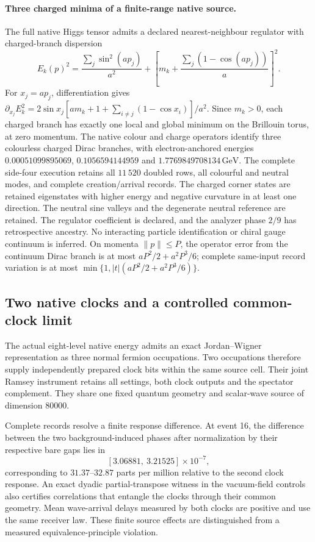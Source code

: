 \paragraph{Three charged minima of a finite-range native source.}
The full native Higgs tensor admits a declared nearest-neighbour regulator
with charged-branch dispersion
\[
 E_k(p)^2=\frac{\sum_j\sin^2(ap_j)}{a^2}
 +\left[m_k+\frac{\sum_j(1-\cos(ap_j))}{a}\right]^2.
\]
For $x_j=ap_j$, differentiation gives
$\partial_{x_j}E_k^2=2\sin x_j
[am_k+1+\sum_{i\ne j}(1-\cos x_i)]/a^2$.
Since $m_k>0$, each charged branch has exactly one local and global
minimum on the Brillouin torus, at zero momentum.
The native colour and charge operators identify three colourless charged
Dirac branches, with electron-anchored energies
$0.00051099895069$, $0.1056594144959$ and $1.7769849708134\,\mathrm{GeV}$.
The complete side-four execution retains all $11\,520$ doubled rows,
all colourful and neutral modes, and complete creation/arrival records.
The charged corner states are retained eigenstates with higher
energy and negative curvature in at least one direction.
The neutral sine valleys and the degenerate neutral reference are retained.
The regulator coefficient is declared, and the analyzer phase $2/9$
has retrospective ancestry. No interacting particle identification or
chiral gauge continuum is inferred. On momenta $\lVert p\rVert\leq P$,
the operator error from the continuum Dirac branch is at most
$aP^2/2+a^2P^3/6$; complete same-input record variation is at most
$\min\{1,|t|(aP^2/2+a^2P^3/6)\}$.

\subsection{Two native clocks and a controlled common-clock limit}
\label{sec:joint-native-clocks}
The actual eight-level native energy admits an exact Jordan--Wigner representation as three normal fermion occupations. Two occupations therefore supply independently prepared clock bits within the same source cell. Their joint Ramsey instrument retains all settings, both clock outputs and the spectator complement. They share one fixed quantum geometry and scalar-wave source of dimension $80000$.

Complete records resolve a finite response difference. At event 16, the difference between the two background-induced phases after normalization by their respective bare gaps lies in
\[
[3.06881,\ 3.21525]\times10^{-7},
\]
corresponding to $31.37$--$32.87$ parts per million relative to the second clock response. An exact dyadic partial-transpose witness in the vacuum-field controls also certifies correlations that entangle the clocks through their common geometry. Mean wave-arrival delays measured by both clocks are positive and use the same receiver law. These finite source effects are distinguished from a measured equivalence-principle violation.

